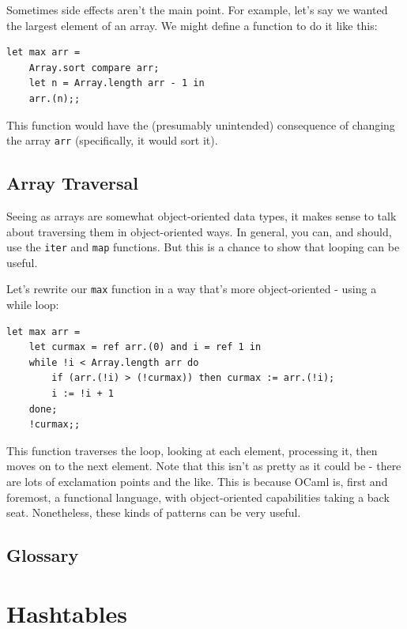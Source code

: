 \documentclass[10pt]{book}
\begin{document}
{Sometimes side effects aren't the main point. For example, let's
say we wanted the largest element of an array. We might define a 
function to do it like this: 

\beforeverb
\begin{verbatim}
let max arr = 
	Array.sort compare arr;
	let n = Array.length arr - 1 in 	
	arr.(n);;
\end{verbatim}
\afterverb

This function would have the (presumably unintended) consequence of
changing the array {\tt arr} (specifically, it would sort it).

\section{Array Traversal}

Seeing as arrays are somewhat object-oriented data types, it makes sense to 
talk about traversing them in object-oriented ways. In general, you 
can, and should, use the {\tt iter} and {\tt map} functions. But this 
is a chance to show that looping can be useful.

Let's rewrite our {\tt max} function in a way that's more object-oriented - 
using a while loop:

\beforeverb
\begin{verbatim}
let max arr = 
	let curmax = ref arr.(0) and i = ref 1 in
	while !i < Array.length arr do
		if (arr.(!i) > (!curmax)) then curmax := arr.(!i);
		i := !i + 1
	done;
	!curmax;;
\end{verbatim}
\afterverb

This function traverses the loop, looking at each element, processing it,
then moves on to the next element. Note that this isn't as pretty as it 
could be - there are lots of exclamation points and the like. This is because 
OCaml is, first and foremost, a functional language, with object-oriented 
capabilities taking a back seat. Nonetheless, these kinds of patterns can be 
very useful.

\section{Glossary}

\chapter{Hashtables}


}
\end{document}
